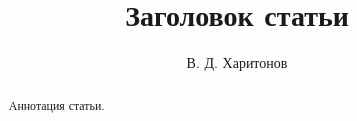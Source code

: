 \documentclass[10pt,a4paper,oneside]{article}
\begin{document}
 
\title{Заголовок статьи}
\author{В. Д. Харитонов}

\makemytitle

\begin{abstract}
    Аннотация статьи.
\end{abstract}





\end{document}
